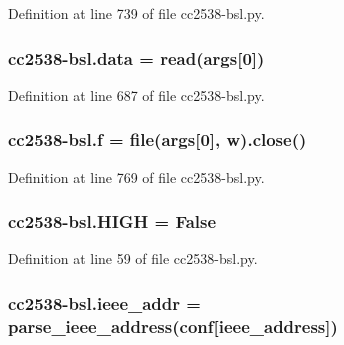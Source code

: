 Definition at line 739 of file cc2538-\/bsl.\+py.

\subsubsection[{\texorpdfstring{data}{data}}]{\setlength{\rightskip}{0pt plus 5cm}cc2538-\/bsl.\+data = {\bf read}({\bf args}\mbox{[}0\mbox{]})}\hypertarget{namespacecc2538-bsl_a3d688c81e05e22c332b51d3567cb43f7}{}\label{namespacecc2538-bsl_a3d688c81e05e22c332b51d3567cb43f7}


Definition at line 687 of file cc2538-\/bsl.\+py.

\subsubsection[{\texorpdfstring{f}{f}}]{\setlength{\rightskip}{0pt plus 5cm}cc2538-\/bsl.\+f = file({\bf args}\mbox{[}0\mbox{]}, \textquotesingle{}w\textquotesingle{}).close()}\hypertarget{namespacecc2538-bsl_a8f64920fa83dd3645670a989c153360b}{}\label{namespacecc2538-bsl_a8f64920fa83dd3645670a989c153360b}


Definition at line 769 of file cc2538-\/bsl.\+py.

\subsubsection[{\texorpdfstring{H\+I\+GH}{HIGH}}]{ cc2538-\/bsl.\+H\+I\+GH = False}\hypertarget{namespacecc2538-bsl_a46969c4c645f3f2ed5951863eddd9d3e}{}\label{namespacecc2538-bsl_a46969c4c645f3f2ed5951863eddd9d3e}


Definition at line 59 of file cc2538-\/bsl.\+py.

\subsubsection[{\texorpdfstring{ieee\+\_\+addr}{ieee_addr}}]{\setlength{\rightskip}{0pt plus 5cm}cc2538-\/bsl.\+ieee\+\_\+addr = {\bf parse\+\_\+ieee\+\_\+address}({\bf conf}\mbox{[}\textquotesingle{}ieee\+\_\+address\textquotesingle{}\mbox{]})}\hypertarget{namespacecc2538-bsl_a9fce00e907fff4ee6b8c5ff384c4e3af}{}\label{namespacecc2538-bsl_a9fce00e907fff4ee6b8c5ff384c4e3af}


